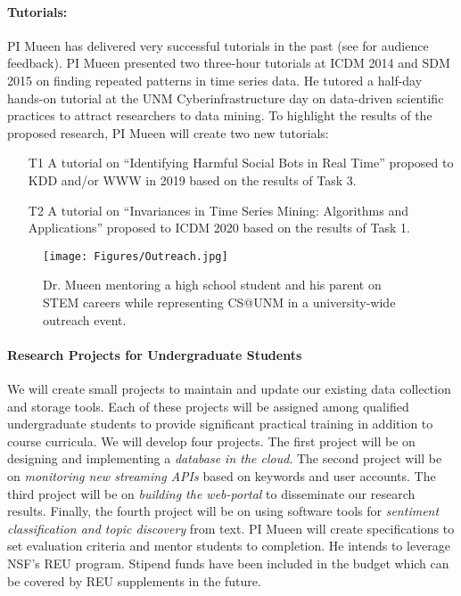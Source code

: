 \paragraph{Tutorials:} PI Mueen has delivered very successful tutorials in the past (see \cite{Page} for audience feedback). PI Mueen presented two three-hour tutorials at ICDM 2014 and SDM 2015 on finding repeated patterns in time series data. He tutored a half-day hands-on tutorial at the UNM Cyberinfrastructure day on data-driven scientific practices to attract researchers to data mining. To highlight the results of the proposed research, PI Mueen will create two new tutorials:
\vspace{-0.2cm}
\begin{itemize}[noitemsep,leftmargin=*]
\item [T1] A tutorial on ``Identifying Harmful Social Bots in Real Time'' proposed to KDD and/or WWW in 2019 based on the results of Task 3. 
\item [T2] A tutorial on ``Invariances in Time Series Mining: Algorithms and Applications'' proposed to ICDM 2020 based on the results of Task 1.
\end{itemize}

\begin{wrapfigure}{r}{0.3\textwidth}
\vspace{-2.9cm}
\begin{center}
\texttt{[image: Figures/Outreach.jpg]}
\caption{{\scriptsize Dr. Mueen mentoring a high school student and his parent on STEM careers while representing CS@UNM in a university-wide outreach event.}}
\label{fig:Outreach}
\end{center}
\vspace{-1.0cm}
\end{wrapfigure}
\paragraph{Research Projects for Undergraduate Students}
We will create small projects to maintain and update our existing data collection and storage tools. Each of these projects will be assigned among qualified undergraduate students to provide significant practical training in addition to course curricula. We will develop four projects. The first project will be on designing and implementing a {\it database in the cloud}. The second project will be on {\it monitoring new streaming APIs} based on keywords and user accounts. The third project will be on {\it building the web-portal} to disseminate our research results. Finally, the fourth project will be on using software tools for {\it sentiment classification and topic discovery} from text. PI Mueen will create specifications to set evaluation criteria and mentor students to completion. He intends to leverage NSF's REU program. Stipend funds have been included in the budget which can be covered by REU supplements in the future.




